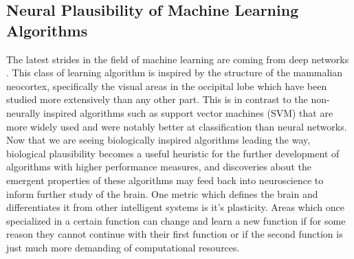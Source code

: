 \documentclass[12pt]{article}
\begin{document}
\begin{doublespacing}
	\subsection{Neural Plausibility of Machine Learning Algorithms}
		The latest strides in the field of machine learning are coming from deep networks \cite{hinton2012deep, lee2009convolutional, grubb2010boosted, tang2012deep, krizhevsky2012imagenet, bengio2009learning}. This class of learning algorithm is inspired by the structure of the mammalian neocortex, specifically the visual areas in the occipital lobe which have been studied more extensively than any other part. This is in contrast to the non-neurally inspired algorithms such as support vector machines  (SVM) that are more widely used and were notably better at classification than neural networks. %
Now that we are seeing biologically inspired algorithms leading the way, biological plausibility becomes a useful heuristic for the further development of algorithms with higher performance measures, and discoveries about the emergent properties of these algorithms may feed back into neuroscience to inform further study of the brain. 
		One metric which defines the brain and differentiates it from other intelligent systems is it's plasticity. Areas which once specialized in a certain function can change and learn a new function if for some reason they cannot continue with their first function or if the second function is just much more demanding of computational resources. \cite{sharma2000induction}
		

\end{doublespacing}
\end{document}
